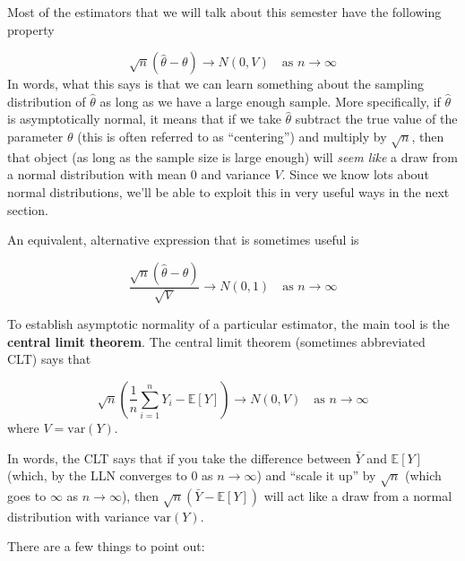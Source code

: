 \documentclass[
  letterpaper,
  DIV=11,
  numbers=noendperiod]{scrreprt}
\begin{document}
Most of the estimators that we will talk about this semester have the
following property

\[
  \sqrt{n}\left( \hat{\theta} - \theta \right) \rightarrow N(0,V) \quad \textrm{as } n \rightarrow \infty
\] In words, what this says is that we can learn something about the
sampling distribution of \(\hat{\theta}\) as long as we have a large
enough sample. More specifically, if \(\hat{\theta}\) is asymptotically
normal, it means that if we take \(\hat{\theta}\) subtract the true
value of the parameter \(\theta\) (this is often referred to as
``centering'') and multiply by \(\sqrt{n}\), then that object (as long
as the sample size is large enough) will \emph{seem like} a draw from a
normal distribution with mean 0 and variance \(V\). Since we know lots
about normal distributions, we'll be able to exploit this in very useful
ways in the next section.

An equivalent, alternative expression that is sometimes useful is

\[
  \frac{\sqrt{n}\left( \hat{\theta} - \theta\right)}{\sqrt{V}} \rightarrow N(0,1) \quad \textrm{as } n \rightarrow \infty
\]

To establish asymptotic normality of a particular estimator, the main
tool is the \textbf{central limit theorem}. The central limit theorem
(sometimes abbreviated CLT) says that

\[
  \sqrt{n}\left( \frac{1}{n} \sum_{i=1}^n Y_i - \mathbb{E}[Y]\right) \rightarrow N(0,V) \quad \textrm{as } n \rightarrow \infty
\] where \(V = \mathrm{var}(Y)\).

In words, the CLT says that if you take the difference between
\(\bar{Y}\) and \(\mathbb{E}[Y]\) (which, by the LLN converges to 0 as
\(n \rightarrow \infty\)) and ``scale it up'' by \(\sqrt{n}\) (which
goes to \(\infty\) as \(n \rightarrow \infty\)), then
\(\sqrt{n}(\bar{Y} - \mathbb{E}[Y])\) will act like a draw from a normal
distribution with variance \(\mathrm{var}(Y)\).

There are a few things to point out:
\end{document}
